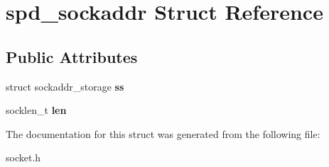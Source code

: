 \hypertarget{structspd__sockaddr}{
\section{spd\_\-sockaddr Struct Reference}
\label{structspd__sockaddr}
}
\subsection*{Public Attributes}
\begin{DoxyCompactItemize}
\item 
\hypertarget{structspd__sockaddr_af035b52fddcb479e79a6c769e432fd90}{
struct sockaddr\_\-storage {\bfseries ss}}
\label{structspd__sockaddr_af035b52fddcb479e79a6c769e432fd90}

\item 
\hypertarget{structspd__sockaddr_a83c6f325ba313f317d40892e5ce8458d}{
socklen\_\-t {\bfseries len}}
\label{structspd__sockaddr_a83c6f325ba313f317d40892e5ce8458d}

\end{DoxyCompactItemize}


The documentation for this struct was generated from the following file:\begin{DoxyCompactItemize}
\item 
socket.h\end{DoxyCompactItemize}
